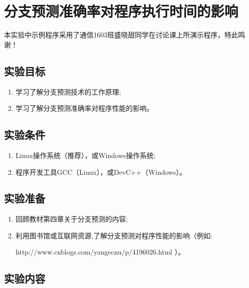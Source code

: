 
\chapter{分支预测准确率对程序执行时间的影响}

本实验中示例程序采用了通信1603班盛晓甜同学在讨论课上所演示程序，特此鸣谢！

\section{实验目标}

\begin{enumerate}
	\item 学习了解分支预测技术的工作原理;
	\item 学习了解分支预测准确率对程序性能的影响。
\end{enumerate}

\section{实验条件}

\begin{enumerate}
	\item Linux操作系统（推荐），或Windows操作系统;
	\item 程序开发工具GCC（Linux），或DevC++（Windows）。
\end{enumerate}

\section{实验准备}

\begin{enumerate}
	\item 回顾教材第四章关于分支预测的内容;
	\item 利用图书馆或互联网资源,了解分支预测对程序性能的影响（例如: 

		http://www.cnblogs.com/yangecnu/p/4196026.html ）。
\end{enumerate}

\section{实验内容}

